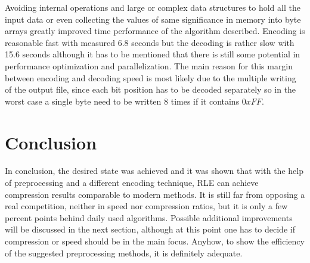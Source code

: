 \par{
	Avoiding internal operations and large or complex data structures to hold all the input data or even collecting the values of same significance in memory into byte arrays greatly improved time performance of the algorithm described. Encoding is reasonable fast with measured 6.8 seconds but the decoding is rather slow with 15.6 seconds although it has to be mentioned that there is still some potential in performance optimization and parallelization. The main reason for this margin between encoding and decoding speed is most likely due to the multiple writing of the output file, since each bit position has to be decoded separately so in the worst case a single byte need to be written 8 times if it contains $0xFF$. 
}

\section{Conclusion}
\label{ch:Evaluation:sec:Conclusion}
\par{
In conclusion, the desired state was achieved and it was shown that with the help of preprocessing and a different encoding technique, RLE can achieve compression results comparable to modern methods. It is still far from opposing a real competition, neither in speed nor compression ratios, but it is only a few percent points behind daily used algorithms. Possible additional improvements will be discussed in the next section, although at this point one has to decide if compression or speed should be in the main focus. Anyhow, to show the efficiency of the suggested preprocessing methods, it is definitely adequate.
}
